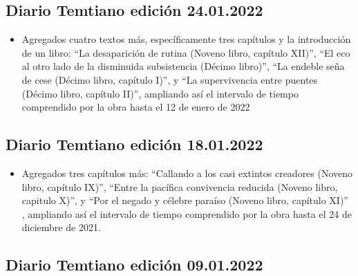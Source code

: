 \documentclass[
]{book}
\providecommand{\tightlist}{%
  \setlength{\itemsep}{0pt}\setlength{\parskip}{0pt}}
\begin{document}
\hypertarget{diario-temtiano-ediciuxf3n-24.01.2022}{%
\subsection*{Diario Temtiano edición 24.01.2022}\label{diario-temtiano-ediciuxf3n-24.01.2022}}

\begin{itemize}
\tightlist
\item
  Agregados cuatro textos más, específicamente tres capítulos y la introducción de un libro: ``La desaparición de rutina (Noveno libro, capítulo XII)'', ``El eco al otro lado de la disminuida subsistencia (Décimo libro)'', ``La endeble seña de cese (Décimo libro, capítulo I)'', y ``La supervivencia entre puentes (Décimo libro, capítulo II)'', ampliando así el intervalo de tiempo comprendido por la obra hasta el 12 de enero de 2022
\end{itemize}

\hypertarget{diario-temtiano-ediciuxf3n-18.01.2022}{%
\subsection*{Diario Temtiano edición 18.01.2022}\label{diario-temtiano-ediciuxf3n-18.01.2022}}

\begin{itemize}
\tightlist
\item
  Agregados tres capítulos más: ``Callando a los casi extintos creadores (Noveno libro, capítulo IX)'', ``Entre la pacífica convivencia reducida (Noveno libro, capitulo X)'', y ``Por el negado y célebre paraíso (Noveno libro, capítulo XI)'' , ampliando así el intervalo de tiempo comprendido por la obra hasta el 24 de diciembre de 2021.
\end{itemize}

\hypertarget{diario-temtiano-ediciuxf3n-09.01.2022}{%
\subsection*{Diario Temtiano edición 09.01.2022}\label{diario-temtiano-ediciuxf3n-09.01.2022}}
\end{document}
